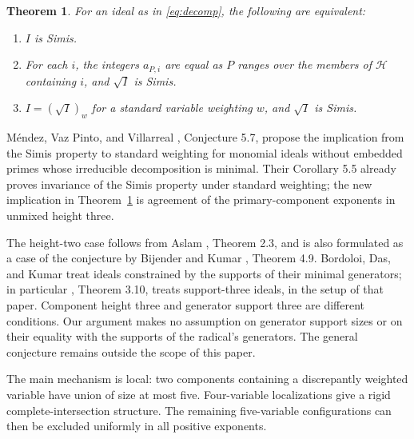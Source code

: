 \documentclass[11pt]{article}
\newtheorem{theorem}{Theorem}
\begin{document}
\begin{theorem}\label{thm:main}
For an ideal as in \eqref{eq:decomp}, the following are equivalent:
\begin{enumerate}
\item $I$ is Simis.
\item For each $i$, the integers $a_{P,i}$ are equal as $P$ ranges
over the members of $\mathcal H$ containing $i$, and $\sqrt I$ is Simis.
\item $I=(\sqrt I)_w$ for a standard variable weighting $w$, and
$\sqrt I$ is Simis.
\end{enumerate}
\end{theorem}

M\'endez, Vaz Pinto, and Villarreal \cite{MPV}, Conjecture 5.7,
propose the implication from the Simis property to standard weighting
for monomial ideals without embedded primes whose irreducible
decomposition is minimal. Their Corollary 5.5 already proves invariance
of the Simis property under standard weighting; the new implication
in Theorem~\ref{thm:main} is agreement of the primary-component
exponents in unmixed height three.

The height-two case follows from Aslam \cite{Aslam}, Theorem 2.3,
and is also formulated as a case of the conjecture by Bijender and
Kumar \cite{BK}, Theorem 4.9. Bordoloi, Das, and Kumar
\cite{BDK2,BDK3} treat ideals constrained by the supports of their
minimal generators; in particular \cite{BDK3}, Theorem 3.10, treats
support-three ideals, in the setup of that paper. Component height
three and generator support three are different conditions.
Our argument makes no assumption on generator support sizes or on
their equality with the supports of the radical's generators.
The general conjecture remains outside the scope of this paper.

The main mechanism is local: two components containing a discrepantly
weighted variable have union of size at most five. Four-variable
localizations give a rigid complete-intersection structure. The
remaining five-variable configurations can then be excluded uniformly
in all positive exponents.
\end{document}
